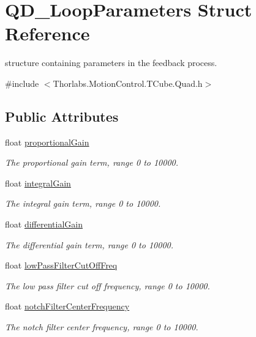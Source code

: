 \hypertarget{struct_q_d___loop_parameters}{}\section{Q\+D\+\_\+\+Loop\+Parameters Struct Reference}
\label{struct_q_d___loop_parameters}


structure containing parameters in the feedback process.  




{\ttfamily \#include $<$Thorlabs.\+Motion\+Control.\+T\+Cube.\+Quad.\+h$>$}

\subsection*{Public Attributes}
\begin{DoxyCompactItemize}
\item 
float \hyperlink{struct_q_d___loop_parameters_ad3c022f266ac6853931939ba030f402b}{proportional\+Gain}
\begin{DoxyCompactList}\small\item\em The proportional gain term, range 0 to 10000. \end{DoxyCompactList}\item 
float \hyperlink{struct_q_d___loop_parameters_a329f8d89d52f2fb5ac77e3c6a4f4faef}{integral\+Gain}
\begin{DoxyCompactList}\small\item\em The integral gain term, range 0 to 10000. \end{DoxyCompactList}\item 
float \hyperlink{struct_q_d___loop_parameters_ab389908a74ae79151f9d63e91081ee4f}{differential\+Gain}
\begin{DoxyCompactList}\small\item\em The differential gain term, range 0 to 10000. \end{DoxyCompactList}\item 
float \hyperlink{struct_q_d___loop_parameters_adb5f4db301162d35d0c93b29da521c54}{low\+Pass\+Filter\+Cut\+Off\+Freq}
\begin{DoxyCompactList}\small\item\em The low pass filter cut off frequency, range 0 to 10000. \end{DoxyCompactList}\item 
float \hyperlink{struct_q_d___loop_parameters_a7d7ce315abd597354398c03a27e0b624}{notch\+Filter\+Center\+Frequency}
\begin{DoxyCompactList}\small\item\em The notch filter center frequency, range 0 to 10000. \end{DoxyCompactList}\item 

\end{DoxyCompactItemize}
